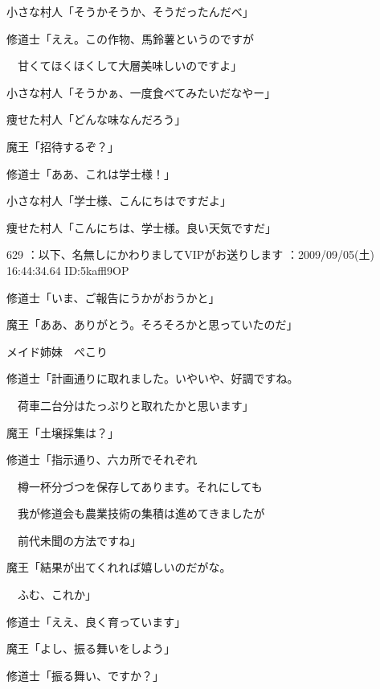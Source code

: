 \documentclass[a4j,twocolumn]{tarticle}
\begin{document}
小さな村人「そうかそうか、そうだったんだべ」 



修道士「ええ。この作物、馬鈴薯というのですが \par{}
　甘くてほくほくして大層美味しいのですよ」 



小さな村人「そうかぁ、一度食べてみたいだなやー」\par{} 
痩せた村人「どんな味なんだろう」 



魔王「招待するぞ？」\par{} 
修道士「ああ、これは学士様！」 



小さな村人「学士様、こんにちはですだよ」\par{} 
痩せた村人「こんにちは、学士様。良い天気ですだ」 

	
    
    

629 ：以下、名無しにかわりましてVIPがお送りします ：2009/09/05(土) 16:44:34.64 ID:5kaffl9OP 


修道士「いま、ご報告にうかがおうかと」\par{} 
魔王「ああ、ありがとう。そろそろかと思っていたのだ」 



メイド姉妹　ぺこり 



修道士「計画通りに取れました。いやいや、好調ですね。\par{} 
　荷車二台分はたっぷりと取れたかと思います」 



魔王「土壌採集は？」 



修道士「指示通り、六カ所でそれぞれ\par{} 
　樽一杯分づつを保存してあります。それにしても\par{} 
　我が修道会も農業技術の集積は進めてきましたが\par{} 
　前代未聞の方法ですね」 



魔王「結果が出てくれれば嬉しいのだがな。\par{} 
　ふむ、これか」 



修道士「ええ、良く育っています」 



魔王「よし、振る舞いをしよう」\par{} 
修道士「振る舞い、ですか？」 
\end{document}
